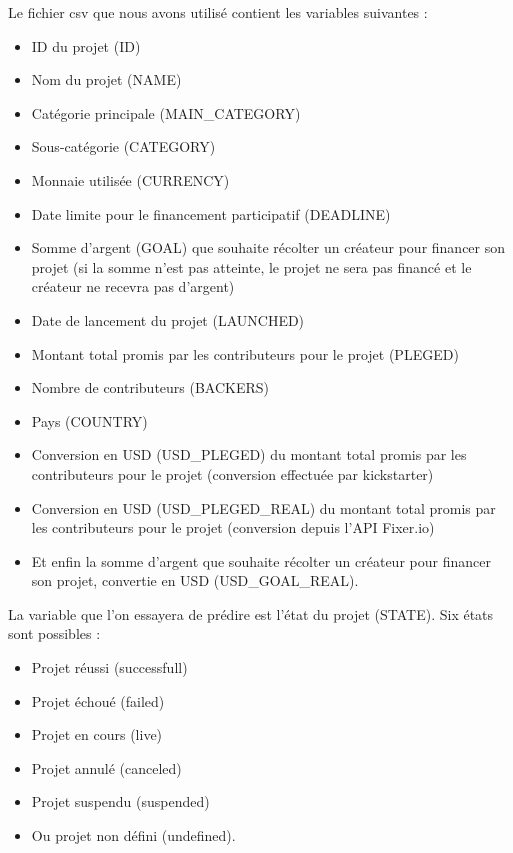 \documentclass{article}
\begin{document}
\noindent Le fichier csv que nous avons utilisé contient les variables suivantes : \newline 
\begin{itemize}
    \item ID du projet (ID)
    \item Nom du projet (NAME)
    \item Catégorie principale (MAIN\_CATEGORY)
    \item Sous-catégorie (CATEGORY)
    \item Monnaie utilisée (CURRENCY)
    \item Date limite pour le financement participatif (DEADLINE)
    \item Somme d'argent (GOAL) que souhaite récolter un créateur pour financer son projet (si la somme n'est pas atteinte, le projet ne sera pas financé et le créateur ne recevra pas d'argent)
    \item Date de lancement du projet (LAUNCHED)
    \item Montant total promis par les contributeurs pour le projet (PLEGED)
    \item Nombre de contributeurs (BACKERS)
    \item Pays (COUNTRY)
    \item Conversion en USD (USD\_PLEGED) du montant total promis par les contributeurs pour le projet (conversion effectuée par kickstarter) 
    \item Conversion en USD (USD\_PLEGED\_REAL) du montant total promis par les contributeurs pour le projet (conversion depuis l'API Fixer.io)
    \item Et enfin la somme d'argent que souhaite récolter un créateur pour financer son projet, convertie en USD (USD\_GOAL\_REAL).\newline 

\end{itemize}

\noindent La variable que l'on essayera de prédire est l'état du projet (STATE). Six états sont possibles :

\begin{itemize}
    \item Projet réussi (successfull)
    \item Projet échoué (failed)
    \item Projet en cours (live)
    \item Projet annulé (canceled)
    \item Projet suspendu (suspended)
    \item Ou projet non défini (undefined).\newline 
\end{itemize}
\end{document}

